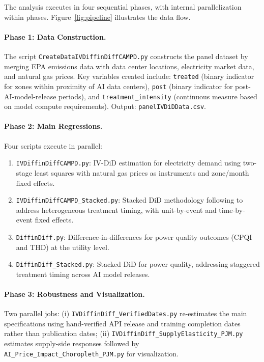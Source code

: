 \documentclass[sigconf]{acmart}
\begin{document}
The analysis executes in four sequential phases, with internal parallelization within phases. Figure~\ref{fig:pipeline} illustrates the data flow.

\paragraph{Phase 1: Data Construction.} The script \texttt{CreateDataIVDiffinDiffCAMPD.py} constructs the panel dataset by merging EPA emissions data with data center locations, electricity market data, and natural gas prices. Key variables created include: \texttt{treated} (binary indicator for zones within proximity of AI data centers), \texttt{post} (binary indicator for post-AI-model-release periods), and \texttt{treatment\_intensity} (continuous measure based on model compute requirements). Output: \texttt{panelIVDiDData.csv}.

\paragraph{Phase 2: Main Regressions.} Four scripts execute in parallel:
\begin{enumerate}[noitemsep,topsep=0pt]
    \item \texttt{IVDiffinDiffCAMPD.py}: IV-DiD estimation for electricity demand using two-stage least squares with natural gas prices as instruments and zone/month fixed effects.
    \item \texttt{IVDiffinDiffCAMPD\_Stacked.py}: Stacked DiD methodology following \citet{cengiz2019effect} to address heterogeneous treatment timing, with unit-by-event and time-by-event fixed effects.
    \item \texttt{DiffinDiff.py}: Difference-in-differences for power quality outcomes (CPQI and THD) at the utility level.
    \item \texttt{DiffinDiff\_Stacked.py}: Stacked DiD for power quality, addressing staggered treatment timing across AI model releases.
\end{enumerate}

\paragraph{Phase 3: Robustness and Visualization.} Two parallel jobs: (i) \texttt{IVDiffinDiff\_VerifiedDates.py} re-estimates the main specifications using hand-verified API release and training completion dates rather than publication dates; (ii) \texttt{IVDiffinDiff\_SupplyElasticity\_PJM.py} estimates supply-side responses followed by \texttt{AI\_Price\_Impact\_Choropleth\_PJM.py} for visualization.
\end{document}
